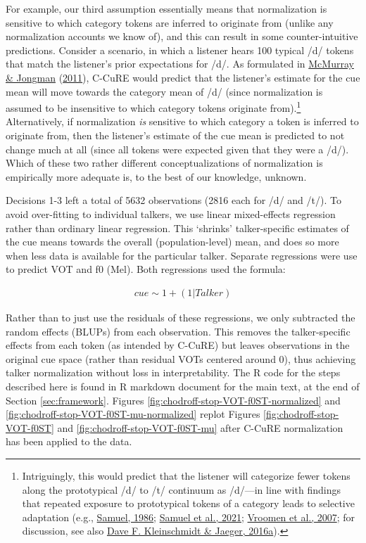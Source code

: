 \documentclass[
  11pt,
  english,
  man,floatsintext]{apa6}
\begin{document}
For example, our third assumption essentially means that normalization is sensitive to which category tokens are inferred to originate from (unlike any normalization accounts we know of), and this can result in some counter-intuitive predictions. Consider a scenario, in which a listener hears 100 typical /d/ tokens that match the listener's prior expectations for /d/. As formulated in \protect\hyperlink{ref-mcmurray-jongman2011}{McMurray \& Jongman} (\protect\hyperlink{ref-mcmurray-jongman2011}{2011}), C-CuRE would predict that the listener's estimate for the cue mean will move towards the category mean of /d/ (since normalization is assumed to be insensitive to which category tokens originate from).\footnote{Intriguingly, this would predict that the listener will categorize fewer tokens along the prototypical /d/ to /t/ continuum as /d/---in line with findings that repeated exposure to prototypical tokens of a category leads to selective adaptation (e.g., \protect\hyperlink{ref-samuel1986}{Samuel, 1986}; \protect\hyperlink{ref-samuel2021}{Samuel et al., 2021}; \protect\hyperlink{ref-vroomen2007}{Vroomen et al., 2007}; for discussion, see also \protect\hyperlink{ref-kleinschmidt-jaeger2016pbr}{Dave F. Kleinschmidt \& Jaeger, 2016a}).} Alternatively, if normalization \emph{is} sensitive to which category a token is inferred to originate from, then the listener's estimate of the cue mean is predicted to not change much at all (since all tokens were expected given that they were a /d/). Which of these two rather different conceptualizations of normalization is empirically more adequate is, to the best of our knowledge, unknown.

Decisions 1-3 left a total of 5632 observations (2816 each for /d/ and /t/). To avoid over-fitting to individual talkers, we use linear mixed-effects regression rather than ordinary linear regression. This `shrinks' talker-specific estimates of the cue means towards the overall (population-level) mean, and does so more when less data is available for the particular talker. Separate regressions were use to predict VOT and f0 (Mel). Both regressions used the formula:

\begin{equation}\label{eq:c-cure-regression}
\begin{split}
cue \sim 1 + (1 | Talker)
\end{split}
\end{equation}

Rather than to just use the residuals of these regressions, we only subtracted the random effects (BLUPs) from each observation. This removes the talker-specific effects from each token (as intended by C-CuRE) but leaves observations in the original cue space (rather than residual VOTs centered around 0), thus achieving talker normalization without loss in interpretability. The R code for the steps described here is found in R markdown document for the main text, at the end of Section \ref{sec:framework}. Figures \ref{fig:chodroff-stop-VOT-f0ST-normalized} and \ref{fig:chodroff-stop-VOT-f0ST-mu-normalized} replot Figures \ref{fig:chodroff-stop-VOT-f0ST} and \ref{fig:chodroff-stop-VOT-f0ST-mu} after C-CuRE normalization has been applied to the data.
\end{document}
